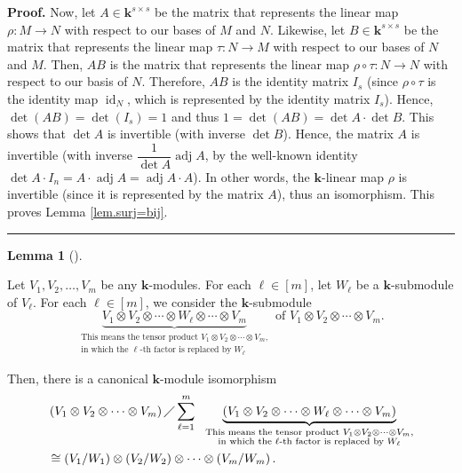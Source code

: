 \documentclass[numbers=enddot,12pt,final,onecolumn,notitlepage]{scrartcl}%
\theoremstyle{definition}
\newtheorem{lem}[theo]{Lemma}
\newenvironment{lemma}[1][]
{\begin{lem}[#1]\begin{leftbar}}
{\end{leftbar}\end{lem}}
\newenvironment{proof}[1][Proof]{\noindent\textbf{#1.} }{\ \rule{0.5em}{0.5em}}
\let\sumnonlimits\sum
\renewcommand{\sum}{\sumnonlimits\limits}
\begin{document}
\begin{proof}
Now, let $A\in\mathbf{k}^{s\times s}$ be the matrix that represents the linear
map $\rho:M\rightarrow N$ with respect to our bases of $M$ and $N$. Likewise,
let $B\in\mathbf{k}^{s\times s}$ be the matrix that represents the linear map
$\tau:N\rightarrow M$ with respect to our bases of $N$ and $M$. Then, $AB$ is
the matrix that represents the linear map $\rho\circ\tau:N\rightarrow N$ with
respect to our basis of $N$. Therefore, $AB$ is the identity matrix $I_{s}$
(since $\rho\circ\tau$ is the identity map $\operatorname*{id}\nolimits_{N}$,
which is represented by the identity matrix $I_{s}$). Hence, $\det\left(
AB\right)  =\det\left(  I_{s}\right)  =1$ and thus $1=\det\left(  AB\right)
=\det A\cdot\det B$. This shows that $\det A$ is invertible (with inverse
$\det B$). Hence, the matrix $A$ is invertible (with inverse $\dfrac{1}{\det
A}\operatorname*{adj}A$, by the well-known identity $\det A\cdot I_{n}%
=A\cdot\operatorname*{adj}A=\operatorname*{adj}A\cdot A$). In other words, the
$\mathbf{k}$-linear map $\rho$ is invertible (since it is represented by the
matrix $A$), thus an isomorphism. This proves Lemma \ref{lem.surj=bij}.
\end{proof}

\begin{lemma}
\label{lem.tensor-of-quots}Let $V_{1},V_{2},\ldots,V_{m}$ be any $\mathbf{k}%
$-modules. For each $\ell\in\left[  m\right]  $, let $W_{\ell}$ be a
$\mathbf{k}$-submodule of $V_{\ell}$. For each $\ell\in\left[  m\right]  $, we
consider the $\mathbf{k}$-submodule
\[
\underbrace{V_{1}\otimes V_{2}\otimes\cdots\otimes W_{\ell}\otimes
\cdots\otimes V_{m}}_{\substack{\text{This means the tensor product }%
V_{1}\otimes V_{2}\otimes\cdots\otimes V_{m}\text{,}\\\text{in which the }%
\ell\text{-th factor is replaced by }W_{\ell}}}\text{ of }V_{1}\otimes
V_{2}\otimes\cdots\otimes V_{m}.
\]


Then, there is a canonical $\mathbf{k}$-module isomorphism%
\begin{align*}
&  \left(  V_{1}\otimes V_{2}\otimes\cdots\otimes V_{m}\right)  \diagup
\sum_{\ell=1}^{m}\ \ \underbrace{\left(  V_{1}\otimes V_{2}\otimes
\cdots\otimes W_{\ell}\otimes\cdots\otimes V_{m}\right)  }%
_{\substack{\text{This means the tensor product }V_{1}\otimes V_{2}%
\otimes\cdots\otimes V_{m}\text{,}\\\text{in which the }\ell\text{-th factor
is replaced by }W_{\ell}}}\\
&  \cong\left(  V_{1}/W_{1}\right)  \otimes\left(  V_{2}/W_{2}\right)
\otimes\cdots\otimes\left(  V_{m}/W_{m}\right)  .
\end{align*}

\end{lemma}
\end{document}
